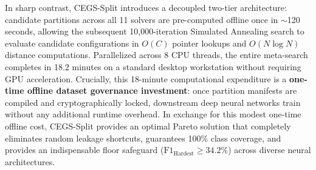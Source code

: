 \documentclass[a4paper,fleqn]{cas-sc}
\begin{document}
In sharp contrast, CEGS-Split introduces a decoupled two-tier architecture: candidate partitions across all 11 solvers are pre-computed offline once in $\sim$120 seconds, allowing the subsequent 10,000-iteration Simulated Annealing search to evaluate candidate configurations in $O(C)$ pointer lookups and $O(N \log N)$ distance computations. Parallelized across 8 CPU threads, the entire meta-search completes in 18.2 minutes on a standard desktop workstation without requiring GPU acceleration. Crucially, this 18-minute computational expenditure is a \textbf{one-time offline dataset governance investment}: once partition manifests are compiled and cryptographically locked, downstream deep neural networks train without any additional runtime overhead. In exchange for this modest one-time offline cost, CEGS-Split provides an optimal Pareto solution that completely eliminates random leakage shortcuts, guarantees 100\% class coverage, and provides an indispensable floor safeguard ($\mathrm{F1}_{\text{Hardest}} \ge 34.2\%$) across diverse neural architectures.
\end{document}
